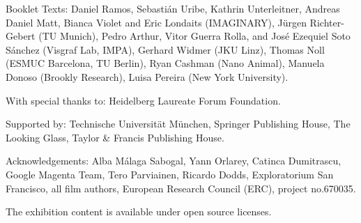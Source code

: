 Booklet Texts:
Daniel Ramos, Sebastián Uribe, Kathrin Unterleitner, Andreas Daniel Matt, Bianca Violet and Eric Londaits (IMAGINARY), Jürgen Richter-Gebert (TU Munich), Pedro Arthur, Vitor Guerra Rolla, and José Ezequiel Soto Sánchez (Visgraf Lab, IMPA), Gerhard Widmer (JKU Linz), Thomas Noll (ESMUC Bar\-ce\-lo\-na, TU Berlin), Ryan Cashman (Nano Animal), Manuela Donoso (Brookly Research), Luisa Pereira (New York University).

With special thanks to:
Heidelberg Laureate Forum Foundation.

Supported by:
Technische Universität München, Springer Publishing House, The Looking Glass, Taylor \& Francis Publishing House.

Acknowledgements: 
Alba Málaga Sabogal, Yann Orlarey, Catinca Dumitrascu, Google Magenta Team, Tero Parviainen, Ricardo Dodds, Exploratorium San Francisco, all film authors, European Research Council (ERC), project no.670035.

The exhibition content is available under open source licenses.

